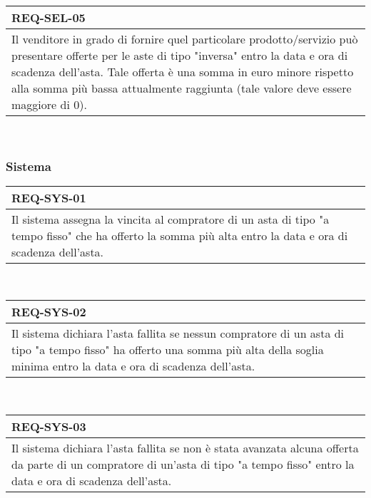                 \begin{tabular}{|p{}|}
                    \hline
                    \multicolumn{1}{|l|}{\cellcolor{head}\textbf{REQ-SEL-05}} \\
                    \hline
                    Il venditore in grado di fornire quel particolare prodotto/servizio può presentare offerte per le aste di tipo "inversa" entro la data e ora di scadenza dell'asta. Tale offerta è una somma in euro minore rispetto alla somma più bassa attualmente raggiunta (tale valore deve essere maggiore di 0). \\
                    \hline
                \end{tabular} \smallskip \\
            
            \subsubsection{Sistema}
                \begin{tabular}{|p{}|}
                    \hline
                    \multicolumn{1}{|l|}{\cellcolor{head}\textbf{REQ-SYS-01}} \\
                    \hline
                    Il sistema assegna la vincita al compratore di un asta di tipo "a tempo fisso" che ha offerto la somma più alta entro la data e ora di scadenza dell'asta. \\
                    \hline
                \end{tabular} \smallskip \\
                \begin{tabular}{|p{}|}
                    \hline
                    \multicolumn{1}{|l|}{\cellcolor{head}\textbf{REQ-SYS-02}} \\
                    \hline
                    Il sistema dichiara l'asta fallita se nessun compratore di un asta di tipo "a tempo fisso" ha offerto una somma più alta della soglia minima entro la data e ora di scadenza dell'asta. \\
                    \hline
                \end{tabular} \smallskip \\
                \begin{tabular}{|p{}|}
                    \hline
                    \multicolumn{1}{|l|}{\cellcolor{head}\textbf{REQ-SYS-03}} \\
                    \hline
                    Il sistema dichiara l'asta fallita se non è stata avanzata alcuna offerta da parte di un compratore di un'asta di tipo "a tempo fisso" entro la data e ora di scadenza dell'asta. \\
                    \hline
                \end{tabular} \smallskip \\
